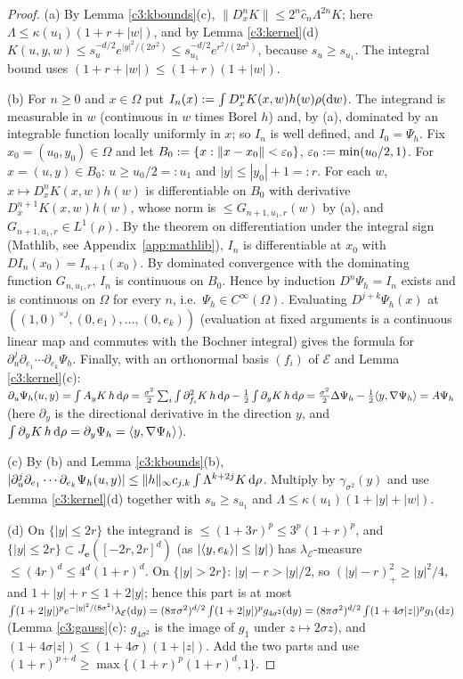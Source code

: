 \begin{proof}
(a) By Lemma \ref{c3:kbounds}(c), $\|D^n_xK\|\le2^n\hat c_n\Lambda^{2n}K$; here $\Lambda\le\kappa(u_1)(1+r+|w|)$, and by Lemma \ref{c3:kernel}(d) $K(u,y,w)\le s_u^{-d/2}e^{|y|^2/(2\sigma^2)}\le s_{u_1}^{-d/2}e^{r^2/(2\sigma^2)}$, because $s_u\ge s_{u_1}$. The integral bound uses $(1+r+|w|)\le(1+r)(1+|w|)$.

(b) For $n\ge0$ and $x\in\Omega$ put $I_n(x):=\int D^n_xK(x,w)h(w)\rho(\mathrm{d} w)$. The integrand is measurable in $w$ (continuous in $w$ times Borel $h$) and, by (a), dominated by an integrable function locally uniformly in $x$; so $I_n$ is well defined, and $I_0=\Psi_h$.
Fix $x_0=(u_0,y_0)\in\Omega$ and let $B_0:=\{x:\|x-x_0\|<\varepsilon_0\}$, $\varepsilon_0:=\min(u_0/2,1)$. For $x=(u,y)\in B_0$: $u\ge u_0/2=:u_1$ and $|y|\le|y_0|+1=:r$. For each $w$, $x\mapsto D^n_xK(x,w)h(w)$ is differentiable on $B_0$ with derivative $D^{n+1}_xK(x,w)h(w)$, whose norm is $\le G_{n+1,u_1,r}(w)$ by (a), and $G_{n+1,u_1,r}\in L^1(\rho)$.
By the theorem on differentiation under the integral sign (Mathlib, see Appendix~\ref{app:mathlib}), $I_n$ is differentiable at $x_0$ with $DI_n(x_0)=I_{n+1}(x_0)$. By dominated convergence with the dominating function $G_{n,u_1,r}$, $I_n$ is continuous on $B_0$.
Hence by induction $D^n\Psi_h=I_n$ exists and is continuous on $\Omega$ for every $n$, i.e.\ $\Psi_h\in C^\infty(\Omega)$.
Evaluating $D^{j+k}\Psi_h(x)$ at $((1,0)^{\times j},(0,e_1),\dots,(0,e_k))$ (evaluation at fixed arguments is a continuous linear map and commutes with the Bochner integral) gives the formula for $\partial_u^j\partial_{e_1}\cdots\partial_{e_k}\Psi_h$.
Finally, with an orthonormal basis $(f_i)$ of $\mathcal E$ and Lemma \ref{c3:kernel}(c):
$\partial_u\Psi_h(u,y)=\int A_yK\,h\,\mathrm{d}\rho=\frac{\sigma^2}2\sum_i\int\partial_{f_i}^2K\,h\,\mathrm{d}\rho-\frac12\int\partial_yK\,h\,\mathrm{d}\rho=\frac{\sigma^2}2\Delta\Psi_h-\frac12\langle y,\nabla\Psi_h\rangle=A\Psi_h$
(here $\partial_y$ is the directional derivative in the direction $y$, and $\int\partial_yK\,h\,\mathrm{d}\rho=\partial_y\Psi_h=\langle y,\nabla\Psi_h\rangle$).

(c) By (b) and Lemma \ref{c3:kbounds}(b), $|\partial_u^j\partial_{e_1}\cdots\partial_{e_k}\Psi_h(u,y)|\le\|h\|_\infty c_{j,k}\int\Lambda^{k+2j}K\,\mathrm{d}\rho$. Multiply by $\gamma_{\sigma^2}(y)$ and use Lemma \ref{c3:kernel}(d) together with $s_u\ge s_{u_1}$ and $\Lambda\le\kappa(u_1)(1+|y|+|w|)$.

(d) On $\{|y|\le2r\}$ the integrand is $\le(1+3r)^p\le3^p(1+r)^p$, and $\{|y|\le2r\}\subset J_{\mathbf e}([-2r,2r]^d)$ (as $|\langle y,e_k\rangle|\le|y|$) has $\lambda_{\mathcal E}$-measure $\le(4r)^d\le4^d(1+r)^d$.
On $\{|y|>2r\}$: $|y|-r>|y|/2$, so $(|y|-r)_+^2\ge|y|^2/4$, and $1+|y|+r\le1+2|y|$; hence this part is at most
$\int(1+2|y|)^pe^{-|y|^2/(8\sigma^2)}\lambda_{\mathcal E}(\mathrm{d} y)=(8\pi\sigma^2)^{d/2}\int(1+2|y|)^pg_{4\sigma^2}(\mathrm{d} y)=(8\pi\sigma^2)^{d/2}\int(1+4\sigma|z|)^pg_1(\mathrm{d} z)$
(Lemma \ref{c3:gauss}(c): $g_{4\sigma^2}$ is the image of $g_1$ under $z\mapsto2\sigma z$), and $(1+4\sigma|z|)\le(1+4\sigma)(1+|z|)$. Add the two parts and use $(1+r)^{p+d}\ge\max\{(1+r)^p(1+r)^d,1\}$.
\end{proof}

